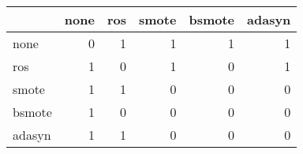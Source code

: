 \begin{tabular}{lrrrrr}
\hline
        &   none &   ros &   smote &   bsmote &   adasyn \\
\hline
 none   &      0 &     1 &       1 &        1 &        1 \\
 ros    &      1 &     0 &       1 &        0 &        1 \\
 smote  &      1 &     1 &       0 &        0 &        0 \\
 bsmote &      1 &     0 &       0 &        0 &        0 \\
 adasyn &      1 &     1 &       0 &        0 &        0 \\
\hline
\end{tabular}